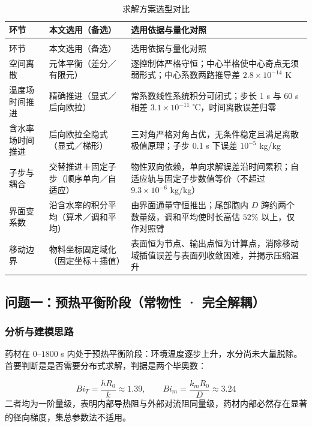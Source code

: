 \begin{longtable}{>{\raggedright\arraybackslash}m{\dimexpr 0.174\tblw\relax}>{\raggedright\arraybackslash}m{\dimexpr 0.306\tblw\relax}>{\raggedright\arraybackslash}m{\dimexpr 0.520\tblw\relax}}
  \caption{求解方案选型对比}\label{tab:5-1}\\
  \toprule
    环节 & 本文选用（备选） & 选用依据与量化对照 \\
  \midrule
  \endfirsthead
  \multicolumn{3}{r}{\footnotesize（续）}\\
  \toprule
    环节 & 本文选用（备选） & 选用依据与量化对照 \\
  \midrule
  \endhead
  \bottomrule
  \endfoot
  \bottomrule
  \endlastfoot
  空间离散 & 元体平衡（差分／有限元） & 逐控制体严格守恒；中心半格使中心奇点无须弱形式；中心系数两路推导差 $2.8\times10^{-14}$ K \\
  温度场时间推进 & 精确推进（显式／后向欧拉） & 常系数线性系统积分可闭式；步长 1 s 与 60 s 相差 $3.1\times10^{-11}$ ℃，时间离散误差归零 \\
  含水率场时间推进 & 后向欧拉全隐式（显式／梯形） & 三对角严格对角占优，无条件稳定且满足离散极值原理；子步 0.1 s 下误差 $10^{-5}$ kg/kg \\
  子步与耦合 & 交替推进＋固定子步（顺序单向／自适应） & 物性双向依赖，单向求解误差沿时间累积；自适应轨与固定子步数值等价（不超过 $9.3\times10^{-6}$ kg/kg） \\
  界面变系数 & 沿含水率的积分平均（算术／调和平均） & 由界面通量守恒推出；尾部胞内 $D$ 跨约两个数量级，调和平均使时长高估 $52\%$ 以上，仅作对照臂 \\
  移动边界 & 物料坐标固定域化（固定坐标＋插值） & 表面恒为节点、输出点恒为计算点，消除移动域插值误差与表面列收敛困难，并揭示压缩温升 \\
\end{longtable}

\subsection{问题一：预热平衡阶段（常物性 · 完全解耦）}
\subsubsection{分析与建模思路}
药材在 $0$–$1800$ s 内处于预热平衡阶段：环境温度逐步上升，水分尚未大量脱除。首要判断是是否需要分布式求解，判据是两个毕奥数：

\begin{equation}
  Bi_T=\frac{hR_0}{k}\approx1.39,\qquad Bi_m=\frac{k_mR_0}{D}\approx3.24
  \label{eq:5-14}
\end{equation}
二者均为一阶量级，表明内部导热阻与外部对流阻同量级，药材内部必然存在显著的径向梯度，集总参数法不适用\textsuperscript{\cite{ref1,ref8}}。


